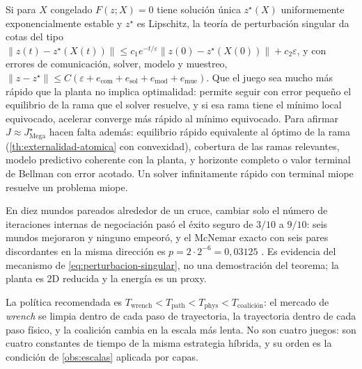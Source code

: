 \begin{observacion}
\label{obs:escalas}
Si para $X$ congelado $F(z;X)=0$ tiene solución única $z^\star(X)$
uniformemente exponencialmente estable y $z^\star$ es Lipschitz, la teoría de
perturbación singular da cotas del tipo
$\lVert z(t)-z^\star(X(t))\rVert\le c_1e^{-t/\varepsilon}\lVert z(0)-z^\star(X(0))\rVert+c_2\varepsilon$,
y con errores de comunicación, solver, modelo y muestreo,
$\lVert z-z^\star\rVert\le C(\varepsilon+e_{\mathrm{com}}+e_{\mathrm{sol}}+e_{\mathrm{mod}}+e_{\mathrm{mue}})$.
Que el juego sea mucho más rápido que la planta no implica optimalidad: permite
seguir con error pequeño el equilibrio de la rama que el solver resuelve, y si
esa rama tiene el mínimo local equivocado, acelerar converge más rápido al
mínimo equivocado. Para afirmar $J\approx J^\star_{\mathrm{Mega}}$ hacen
falta además: equilibrio rápido equivalente al óptimo de la rama
(\cref{th:externalidad-atomica} con convexidad), cobertura de las ramas
relevantes, modelo predictivo coherente con la planta, y horizonte completo o
valor terminal de Bellman con error acotado. Un solver infinitamente rápido
con terminal miope resuelve un problema miope.
\end{observacion}

\begin{observacion}
\label{obs:escalas-num}
En diez mundos pareados alrededor de un cruce, cambiar solo el número de
iteraciones internas de negociación pasó el éxito seguro de $3/10$ a $9/10$:
seis mundos mejoraron y ninguno empeoró, y el McNemar exacto con seis pares
discordantes en la misma dirección es $p=2\cdot2^{-6}=0{,}03125$
\cite{mayorga2026compendio}. Es evidencia del mecanismo de
\eqref{eq:perturbacion-singular}, no una demostración del teorema; la planta
es 2D reducida y la energía es un proxy.
\end{observacion}

\begin{observacion}
\label{obs:cuatro-relojes}
La política recomendada es
$T_{\mathrm{wrench}}<T_{\mathrm{path}}<T_{\mathrm{phys}}<T_{\mathrm{coalición}}$:
el mercado de \emph{wrench} se limpia dentro de cada paso de trayectoria, la
trayectoria dentro de cada paso físico, y la coalición cambia en la escala más
lenta. No son cuatro juegos: son cuatro constantes de tiempo de la misma
estrategia híbrida, y su orden es la condición de \cref{obs:escalas} aplicada
por capas.
\end{observacion}

